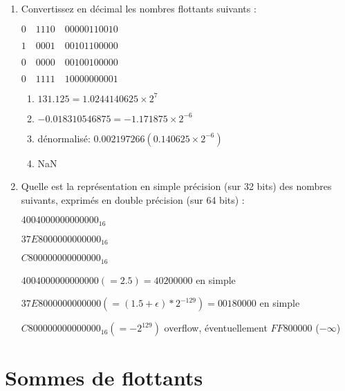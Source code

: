 \documentclass[a4paper,10pt]{exam}
\begin{document}
\begin{enumerate}
\item Convertissez en d\'ecimal les nombres flottants suivants  :

$0\quad 1110\quad 00000110010$

$1\quad 0001\quad 00101100000$

$0\quad 0000\quad 00100100000$

$0\quad 1111\quad 10000000001$

\begin{solution}

\begin{enumerate}
  \item $131.125 = 1.0244140625 \times 2^{7}$
  \item $-0.018310546875 = -1.171875 \times 2^{-6}$
  \item dénormalisé: $0.002197266 (0.140625 \times 2^{-6})$
  \item NaN
\end{enumerate}

\end{solution}

\item Quelle est la repr\'esentation en simple pr\'ecision (sur 32 bits) des nombres suivants, exprim\'es en double pr\'ecision (sur 64 bits) :

$4004000000000000_{16}$

$37E8000000000000_{16}$

$C800000000000000_{16}$

\begin{solution}
$4004000000000000 (= 2.5) = 40200000$ en simple

$37E8000000000000 (= (1.5+\epsilon)*2^{-129}) = 00180000$ en simple

$C800000000000000_{16} (=-2^{129})$ overflow, \'eventuellement $FF800000$ ($-\infty$)

\end{solution}

\end{enumerate}

\pagebreak
\section{Sommes de flottants}
\end{document}
